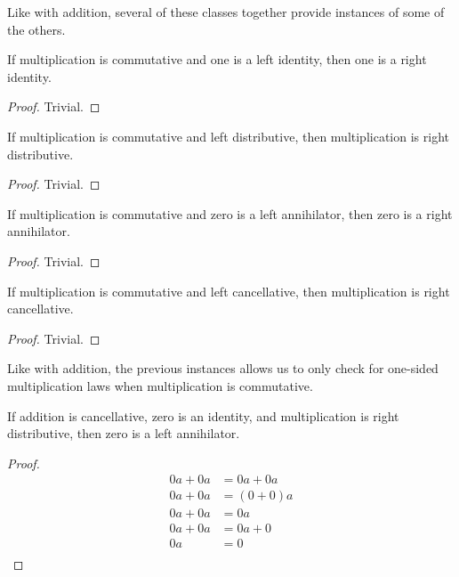 \documentclass[../math.tex]{subfiles}
\begin{document}
Like with addition, several of these classes together provide instances of some
of the others.

\begin{instance}
    If multiplication is commutative and one is a left identity, then one is a
    right identity.
\end{instance}
\begin{proof}
    Trivial.
\end{proof}

\begin{instance} \label{ldist_rdist}
    If multiplication is commutative and left distributive, then multiplication
    is right distributive.
\end{instance}
\begin{proof}
    Trivial.
\end{proof}

\begin{instance} \label{mult_lanni_ranni}
    If multiplication is commutative and zero is a left annihilator, then zero
    is a right annihilator.
\end{instance}
\begin{proof}
    Trivial.
\end{proof}

\begin{instance}
    If multiplication is commutative and left cancellative, then multiplication
    is right cancellative.
\end{instance}
\begin{proof}
    Trivial.
\end{proof}

Like with addition, the previous instances allows us to only check for one-sided
multiplication laws when multiplication is commutative.

\begin{instance} \label{ring_mult_lanni}
    If addition is cancellative, zero is an identity, and multiplication is
    right distributive, then zero is a left annihilator.
\end{instance}
\begin{proof}
    \begin{align*}
        0a + 0a &= 0a + 0a \\
        0a + 0a &= (0 + 0)a \\
        0a + 0a &= 0a \\
        0a + 0a &= 0a + 0 \\
        0a &= 0 \\
    \end{align*}
\end{proof}
\end{document}
